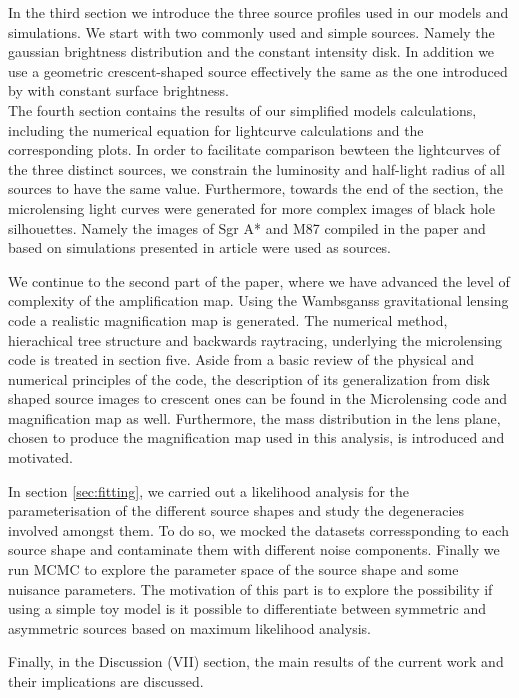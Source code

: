 In the third section we introduce the three source profiles used in our models and simulations. We start with two commonly used and simple sources. Namely the gaussian brightness distribution and the constant intensity disk. In addition we use a geometric crescent-shaped source effectively the same as the one introduced by \citep{2013MNRAS.434..765K} with constant surface brightness. \\ The fourth section contains the results of our simplified models calculations, including the numerical equation for lightcurve calculations and the corresponding plots. 
In order to facilitate comparison bewteen the lightcurves of the three distinct sources, we constrain the luminosity and half-light radius of all sources to have the same value. 
Furthermore, towards the end of the section, the microlensing light curves were generated for more complex images of black hole silhouettes. 
Namely the images of Sgr A* and M87 compiled in the paper \citep{2015MNRAS.446.1973R} and based on simulations presented in \citep{2009MNRAS.394L.126M} article were used as sources.     
       
We continue to the second part of the paper, where we have advanced the level of complexity of the amplification map. Using the Wambsganss gravitational lensing code \citep{1990LNP...360..186W} a realistic magnification map is generated. The numerical method, hierachical tree structure and backwards raytracing, underlying the microlensing code is treated in section five. Aside from a basic review of the physical and numerical principles of the code, the description of its generalization from disk shaped source images to crescent ones can be found in the Microlensing code and magnification map as well. Furthermore, the mass distribution in the lens plane, chosen to produce the magnification map used in this analysis, is introduced and motivated.   


In section \ref{sec:fitting}, we carried out a likelihood analysis for the parameterisation of the different source shapes and study the degeneracies involved amongst them. To do so, we mocked the datasets corressponding to each source shape and contaminate them with different noise components. Finally we run MCMC to explore the parameter space of the source shape and some nuisance parameters. The motivation of this part is to explore the possibility if using a simple toy model is it possible to differentiate between symmetric and asymmetric sources based on maximum likelihood analysis. 


Finally, in the Discussion (VII) section, the main results of the current work and their implications are discussed. 
